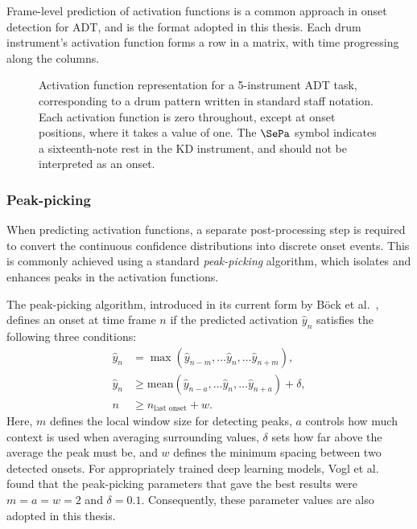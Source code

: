 Frame-level prediction of activation functions is a common approach in onset detection for \gls{ADT}, and is the format adopted in this thesis. Each drum instrument's activation function forms a row in a matrix, with time progressing along the columns.

\begin{figure}[H]
    \centering
    \hspace*{-0.5cm}
    
    \caption{Activation function representation for a 5-instrument \gls{ADT} task, corresponding to a drum pattern written in standard staff notation. Each activation function is zero throughout, except at onset positions, where it takes a value of one. The $\SePa$ symbol indicates a sixteenth-note rest in the \gls{KD} instrument, and should not be interpreted as an onset.}
    \label{ActivationsFigure}
\end{figure}

\subsubsection{Peak-picking}

When predicting activation functions, a separate post-processing step is required to convert the continuous confidence distributions into discrete onset events. This is commonly achieved using a standard \textit{peak-picking} algorithm, which isolates and enhances peaks in the activation functions.

The peak-picking algorithm, introduced in its current form by Böck et al.~\cite{Bck2012EvaluatingTO}, defines an onset at time frame $n$ if the predicted activation $\hat{y}_n$ satisfies the following three conditions:
\begin{align*} 
    \hat{y}_n &= \max(\hat{y}_{n - m}, \dots \hat{y}_n, \dots \hat{y}_{n + m}), \\ 
    \hat{y}_n &\ge \text{mean}(\hat{y}_{n - a}, \dots \hat{y}_n, \dots \hat{y}_{n + a}) + \delta, \\
    n &\ge n_\text{last onset} + w.
\end{align*}
Here, $m$ defines the local window size for detecting peaks, $a$ controls how much context is used when averaging surrounding values, $\delta$ sets how far above the average the peak must be, and $w$ defines the minimum spacing between two detected onsets. For appropriately trained deep learning models, Vogl et al.~\cite{vogl2018multiinstrumentdrumtranscription} found that the peak-picking parameters that gave the best results were $m = a = w = 2$ and $\delta = 0.1$. Consequently, these parameter values are also adopted in this thesis.


